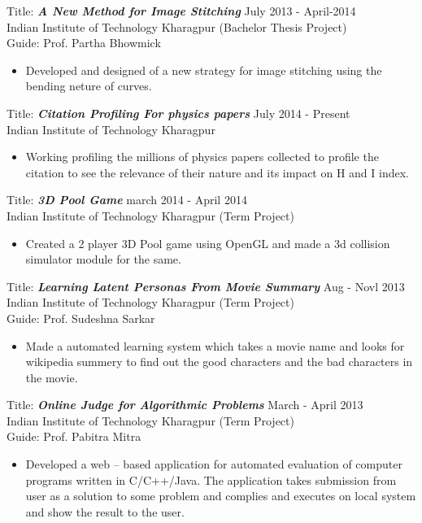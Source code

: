 \documentclass[hidelinks,margin,line,10pt,a4paper]{resume}
\begin{document}
\begin{resume}
Title: \textbf{\emph {A New Method for Image Stitching }} \hfill July 2013 - April-2014 \\ Indian Institute of Technology Kharagpur \hfill (Bachelor Thesis Project) \\
Guide: Prof. Partha Bhowmick
\vspace{2mm}%
\begin{itemize}
\item Developed and designed of a new strategy for image stitching using the bending neture of curves.
\end{itemize}

Title: \textbf{\emph {Citation Profiling For physics papers }} \hfill July 2014 - Present \\ Indian Institute of Technology Kharagpur 
\vspace{2mm}%
\begin{itemize}
\item Working profiling the millions of physics papers collected to profile the citation to see the relevance of their nature and its impact on H and I index.
\end{itemize}

Title: \textbf{\emph {3D Pool Game }} \hfill march 2014 - April 2014\\ Indian Institute of Technology Kharagpur \hfill (Term Project)
\vspace{2mm}%
\begin{itemize}
\item Created a 2 player 3D Pool game using OpenGL and made a 3d collision simulator module for the same.
\end{itemize}


Title: \textbf{\emph{Learning Latent Personas From Movie Summary}} \hfill Aug - Novl 2013 \\
Indian Institute of Technology Kharagpur \hfill (Term Project) \\
Guide: Prof. Sudeshna Sarkar
\vspace{2mm}%
\begin{itemize}
\item Made a automated learning system which takes a movie name and looks for wikipedia summery to find out the good characters and the bad characters in the movie. 
\end{itemize}

Title: \textbf{\emph{Online Judge for Algorithmic Problems}} \hfill March - April 2013 \\
Indian Institute of Technology Kharagpur \hfill (Term Project) \\
Guide: Prof. Pabitra Mitra
\vspace{2mm}%
\begin{itemize}
\item Developed a web – based application for automated evaluation of computer programs written in
C/C++/Java. The application takes submission from user as a solution to some problem and complies and
executes on local system and show the result to the user.
\end{itemize}


\end{resume}
\end{document}

